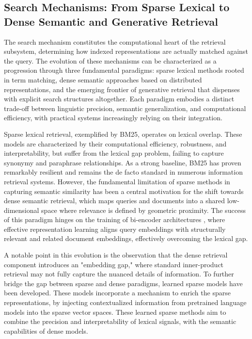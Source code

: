 \documentclass[11pt,a4paper]{article}
\begin{document}
\subsection{Search Mechanisms: From Sparse Lexical to Dense Semantic and Generative Retrieval}


The search mechanism constitutes the computational heart of the retrieval subsystem, determining how indexed representations are actually matched against the query. The evolution of these mechanisms can be characterized as a progression through three fundamental paradigms: sparse lexical methods rooted in term matching, dense semantic approaches based on distributed representations, and the emerging frontier of generative retrieval that dispenses with explicit search structures altogether. Each paradigm embodies a distinct trade-off between linguistic precision, semantic generalization, and computational efficiency, with practical systems increasingly relying on their integration.

Sparse lexical retrieval, exemplified by BM25, operates on lexical overlap. These models are characterized by their computational efficiency, robustness, and interpretability, but suffer from the lexical gap problem, failing to capture synonymy and paraphrase relationships. As a strong baseline, BM25 has proven remarkably resilient and remains the de facto standard in numerous information retrieval systems. However, the fundamental limitation of sparse methods in capturing semantic similarity has been a central motivation for the shift towards dense semantic retrieval, which maps queries and documents into a shared low-dimensional space where relevance is defined by geometric proximity. The success of this paradigm hinges on the training of bi-encoder architectures \cite{arxiv:2005.11401v4}, where effective representation learning aligns query embeddings with structurally relevant and related document embeddings, effectively overcoming the lexical gap.

A notable point in this evolution is the observation that the dense retrieval component introduces an "embedding gap," where standard inner-product retrieval may not fully capture the nuanced details of information. To further bridge the gap between sparse and dense paradigms, learned sparse models have been developed. These models incorporate a mechanism to enrich the sparse representations, by injecting contextualized information from pretrained language models into the sparse vector spaces. These learned sparse methods aim to combine the precision and interpretability of lexical signals, with the semantic capabilities of dense models.
\end{document}
